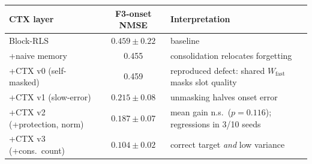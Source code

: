 \begin{tabular}{lcl}
\toprule
CTX layer & F3-onset NMSE & Interpretation \\
\midrule
Block-RLS & $0.459\pm0.22$ & baseline \\
+naive memory & 0.455 & consolidation relocates forgetting \\
+CTX v0 (self-masked) & 0.459 & reproduced defect: shared $W_{\mathrm{fast}}$ masks slot quality \\
+CTX v1 (slow-error) & $0.215\pm0.08$ & unmasking halves onset error \\
+CTX v2 (+protection, norm) & $0.187\pm0.07$ & mean gain n.s.\ ($p{=}0.116$); regressions in 3/10 seeds \\
+CTX v3 (+cons.\ count) & $\mathbf{0.104\pm0.02}$ & correct target \emph{and} low variance \\
\bottomrule
\end{tabular}